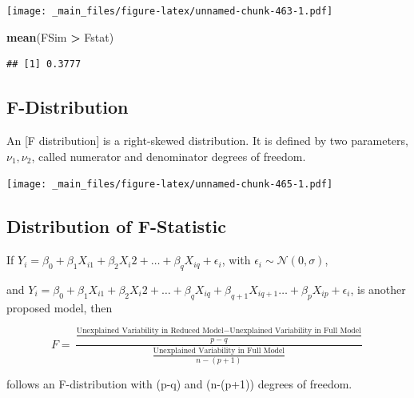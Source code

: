 \documentclass[]{book}
\newenvironment{Shaded}{\begin{snugshade}}{\end{snugshade}}
\newcommand{\KeywordTok}[1]{\textcolor[rgb]{0.13,0.29,0.53}{\textbf{#1}}}
\newcommand{\DecValTok}[1]{\textcolor[rgb]{0.00,0.00,0.81}{#1}}
\newcommand{\StringTok}[1]{\textcolor[rgb]{0.31,0.60,0.02}{#1}}
\newcommand{\OperatorTok}[1]{\textcolor[rgb]{0.81,0.36,0.00}{\textbf{#1}}}
\newcommand{\NormalTok}[1]{#1}
\begin{document}
\begin{Shaded}
\end{Shaded}

\texttt{[image: \_main\_files/figure-latex/unnamed-chunk-463-1.pdf]}

\begin{Shaded}
\begin{Highlighting}[]
\KeywordTok{mean}\NormalTok{(FSim }\OperatorTok{>}\StringTok{ }\NormalTok{Fstat)}
\end{Highlighting}
\end{Shaded}

\begin{verbatim}
## [1] 0.3777
\end{verbatim}

\subsection{F-Distribution}\label{f-distribution-1}

An {[}F distribution{]} is a right-skewed distribution. It is defined by
two parameters, \(\nu_1, \nu_2\), called numerator and denominator
degrees of freedom.

\texttt{[image: \_main\_files/figure-latex/unnamed-chunk-465-1.pdf]}

\subsection{Distribution of
F-Statistic}\label{distribution-of-f-statistic}

If
\(Y_i = \beta_0 + \beta_1X_{i1} + \beta_2{X_i2} + \ldots + \beta_qX_{iq} + \epsilon_i\),
with \(\epsilon_i\sim\mathcal{N}(0,\sigma)\),

and
\(Y_i = \beta_0 + \beta_1X_{i1} + \beta_2{X_i2} + \ldots + \beta_qX_{iq} + \beta_{q+1}X_{i{q+1}} \ldots + \beta_pX_{ip}+ \epsilon_i\),
is another proposed model, then

\[
F=\frac{\frac{\text{Unexplained Variability in Reduced Model}-\text{Unexplained Variability in Full Model}}{p-q}}{\frac{\text{Unexplained Variability in Full Model}}{n-(p+1)}}
\]

follows an F-distribution with (p-q) and (n-(p+1)) degrees of freedom.
\end{document}
